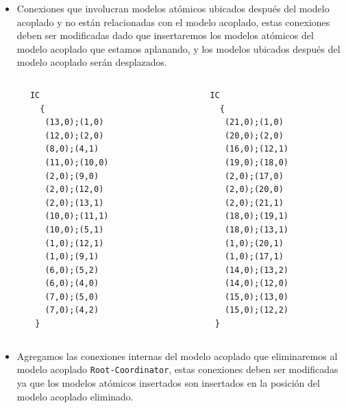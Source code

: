 \documentclass{beamer}
\begin{document}

\begin{frame}
\begin{itemize}
        \item Conexiones que involucran modelos atómicos ubicados después del modelo acoplado y no están relacionadas con el modelo acoplado, 
        estas conexiones deben ser modificadas dado que insertaremos los modelos atómicos del modelo acoplado que estamos aplanando, y los modelos 
        ubicados después del modelo acoplado serán desplazados.
\end{itemize}
\end{frame}

\begin{frame}[fragile]
\begin{columns}[T] %
\begin{column}{.48\textwidth}
\begin{verbatim}
      IC
        {
         (13,0);(1,0)
         (12,0);(2,0)
         (8,0);(4,1)
         (11,0);(10,0)
         (2,0);(9,0)
         (2,0);(12,0)
         (2,0);(13,1)
         (10,0);(11,1)
         (10,0);(5,1)
         (1,0);(12,1)
         (1,0);(9,1)
         (6,0);(5,2)
         (6,0);(4,0)
         (7,0);(5,0)
         (7,0);(4,2)
       }
\end{verbatim}
\end{column}%
\hfill%
\begin{column}{.48\textwidth}
\begin{verbatim}
      IC
        {
         (21,0);(1,0)
         (20,0);(2,0)
         (16,0);(12,1)
         (19,0);(18,0)
         (2,0);(17,0)
         (2,0);(20,0)
         (2,0);(21,1)
         (18,0);(19,1)
         (18,0);(13,1)
         (1,0);(20,1)
         (1,0);(17,1)
         (14,0);(13,2)
         (14,0);(12,0)
         (15,0);(13,0)
         (15,0);(12,2)
       }
\end{verbatim}
\end{column}%
\end{columns}
\end{frame}

\begin{frame}[fragile]
\begin{itemize}
        \item Agregamos las conexiones internas del modelo acoplado que eliminaremos al modelo acoplado \texttt{Root-Coordinator}, estas conexiones deben ser 
        modificadas ya que los modelos atómicos insertados son insertados en la posición del modelo acoplado eliminado.
\end{itemize}
\end{frame}
\end{document}
